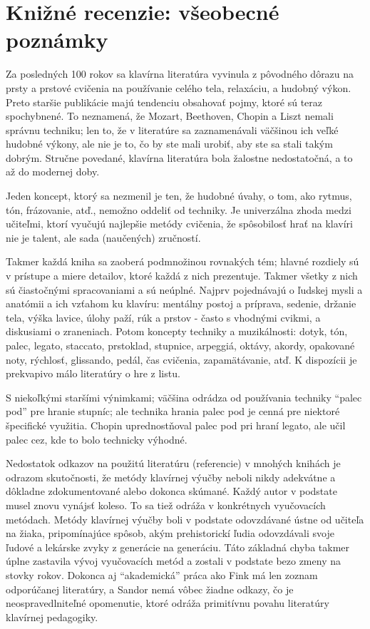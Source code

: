 \documentclass[11pt,a4paper]{book}
\begin{document}
\chapter*{Knižné recenzie: všeobecné poznámky}\label{s:book-reviews}
Za posledných 100 rokov sa klavírna literatúra vyvinula z pôvodného dôrazu na prsty a prstové cvičenia na používanie celého tela, relaxáciu, a hudobný výkon. Preto staršie publikácie majú tendenciu obsahovať pojmy, ktoré sú teraz spochybnené. To neznamená, že Mozart, Beethoven, Chopin a Liszt nemali správnu techniku; len to, že v literatúre sa zaznamenávali väčšinou ich veľké hudobné výkony, ale nie je to, čo by ste mali urobiť, aby ste sa stali takým dobrým. Stručne povedané, klavírna literatúra bola žalostne nedostatočná, a to až do modernej doby. 

Jeden koncept, ktorý sa nezmenil je ten, že hudobné úvahy, o tom, ako rytmus, tón, frázovanie, atď., nemožno oddeliť od techniky. Je univerzálna zhoda medzi učiteľmi, ktorí vyučujú najlepšie metódy cvičenia, že spôsobilosť hrať na klavíri nie je talent, ale sada (naučených) zručností. 

Takmer každá kniha sa zaoberá podmnožinou rovnakých tém; hlavné rozdiely sú v prístupe a miere detailov, ktoré každá z nich prezentuje. Takmer všetky z nich sú čiastočnými spracovaniami a sú  neúplné. Najprv pojednávajú o ľudskej mysli a anatómii a ich vzťahom ku klavíru: mentálny postoj a príprava, sedenie, držanie tela, výška lavice, úlohy paží, rúk a prstov - často s vhodnými cvikmi, a diskusiami o zraneniach. Potom koncepty techniky a muzikálnosti: dotyk, tón, palec, legato, staccato, prstoklad, stupnice, arpeggiá, oktávy, akordy, opakované noty, rýchlosť, glissando, pedál, čas cvičenia, zapamätávanie, atď. K dispozícii je prekvapivo málo literatúry o hre z listu. 

S niekoľkými staršími výnimkami; väčšina odrádza od používania techniky “palec pod” pre hranie stupníc; ale technika hrania palec pod je cenná pre niektoré špecifické využitia. Chopin uprednostňoval palec pod pri hraní legato, ale učil palec cez, kde to bolo technicky výhodné. 

Nedostatok odkazov na použitú literatúru (referencie) v mnohých knihách je odrazom skutočnosti, že metódy klavírnej výučby neboli nikdy adekvátne a dôkladne zdokumentované alebo dokonca skúmané. Každý autor v podstate musel znovu vynájsť koleso. To sa tiež odráža v konkrétnych vyučovacích metódach. Metódy klavírnej výučby boli v podstate odovzdávané ústne od učiteľa na žiaka, pripomínajúce spôsob, akým prehistorickí ľudia odovzdávali svoje ľudové a lekárske zvyky z generácie na generáciu. Táto základná chyba takmer úplne zastavila vývoj vyučovacích metód a zostali v podstate bezo zmeny na stovky rokov. Dokonca aj “akademická” práca ako Fink má len zoznam odporúčanej literatúry, a Sandor nemá vôbec žiadne odkazy, čo je neospravedlniteľné opomenutie, ktoré odráža primitívnu povahu literatúry klavírnej pedagogiky. 
\end{document}
